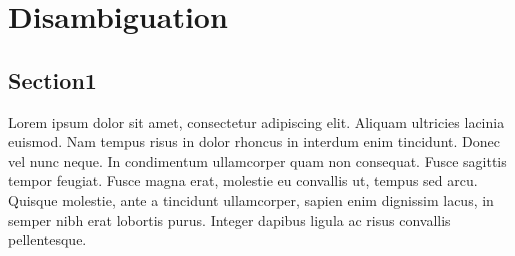 
\chapter{Disambiguation} %

\label{chapter:Disambiguation} %



\section{Section1}

Lorem ipsum dolor sit amet, consectetur adipiscing elit. Aliquam ultricies lacinia euismod. Nam tempus risus in dolor rhoncus in interdum enim tincidunt. Donec vel nunc neque. In condimentum ullamcorper quam non consequat. Fusce sagittis tempor feugiat. Fusce magna erat, molestie eu convallis ut, tempus sed arcu. Quisque molestie, ante a tincidunt ullamcorper, sapien enim dignissim lacus, in semper nibh erat lobortis purus. Integer dapibus ligula ac risus convallis pellentesque.